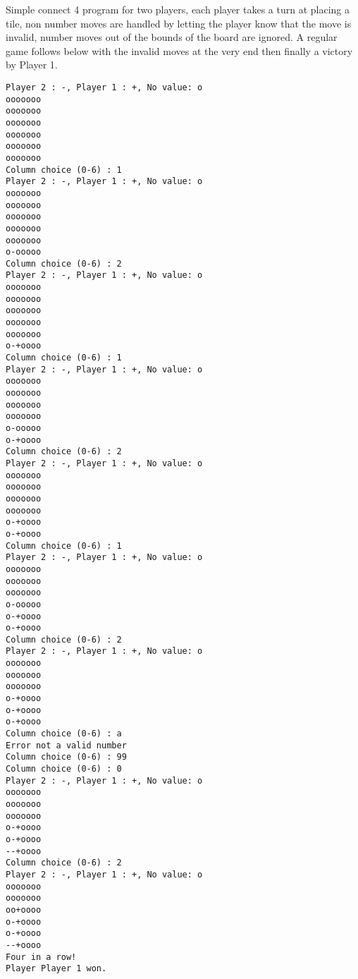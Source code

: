 \documentclass[12pt,fleqn,leqno,letterpaper]{article}
\begin{document}
Simple connect 4 program for two players, each player takes a turn at placing a tile, non number moves are handled by letting the player know that the move is invalid, number moves out of the bounds of the board are ignored. A regular game follows below with the invalid moves at the very end then finally a victory by Player 1.
\begin{lstlisting}
Player 2 : -, Player 1 : +, No value: o
ooooooo
ooooooo
ooooooo
ooooooo
ooooooo
ooooooo
Column choice (0-6) : 1
Player 2 : -, Player 1 : +, No value: o
ooooooo
ooooooo
ooooooo
ooooooo
ooooooo
o-ooooo
Column choice (0-6) : 2
Player 2 : -, Player 1 : +, No value: o
ooooooo
ooooooo
ooooooo
ooooooo
ooooooo
o-+oooo
Column choice (0-6) : 1
Player 2 : -, Player 1 : +, No value: o
ooooooo
ooooooo
ooooooo
ooooooo
o-ooooo
o-+oooo
Column choice (0-6) : 2
Player 2 : -, Player 1 : +, No value: o
ooooooo
ooooooo
ooooooo
ooooooo
o-+oooo
o-+oooo
Column choice (0-6) : 1
Player 2 : -, Player 1 : +, No value: o
ooooooo
ooooooo
ooooooo
o-ooooo
o-+oooo
o-+oooo
Column choice (0-6) : 2
Player 2 : -, Player 1 : +, No value: o
ooooooo
ooooooo
ooooooo
o-+oooo
o-+oooo
o-+oooo
Column choice (0-6) : a
Error not a valid number
Column choice (0-6) : 99
Column choice (0-6) : 0
Player 2 : -, Player 1 : +, No value: o
ooooooo
ooooooo
ooooooo
o-+oooo
o-+oooo
--+oooo
Column choice (0-6) : 2
Player 2 : -, Player 1 : +, No value: o
ooooooo
ooooooo
oo+oooo
o-+oooo
o-+oooo
--+oooo
Four in a row!
Player Player 1 won.
\end{lstlisting}
\end{document}
